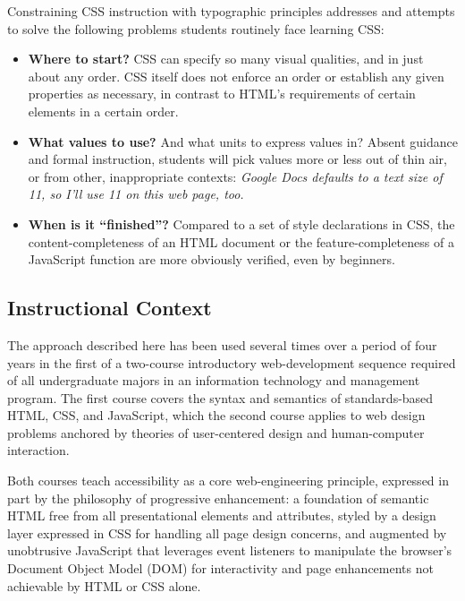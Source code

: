 \documentclass[sigplan,screen]{acmart}
\begin{document}
Constraining CSS instruction with typographic principles addresses and attempts to solve the following problems students routinely face learning CSS:


\begin{itemize}
  \item \textbf{Where to start?} CSS can specify so many visual qualities, and in just about any order. CSS itself does not enforce an order or establish any given properties as necessary, in contrast to HTML’s requirements of certain elements in a certain order.
  \item \textbf{What values to use?} And what units to express values in? Absent guidance and formal instruction, students will pick values more or less out of thin air, or from other, inappropriate contexts: {\itshape Google Docs defaults to a text size of 11, so I’ll use 11 on this web page, too.}
  \item \textbf{When is it “finished”?} Compared to a set of style declarations in CSS, the content-completeness of an HTML document or the feature-completeness of a \linebreak JavaScript function are more obviously verified, even by beginners.
\end{itemize}




\subsection{Instructional Context}
The approach described here has been used several times over a period of four years in the first of a two-course introductory web-development sequence required of all undergraduate majors in an information technology and management program. The first course covers the syntax and semantics of standards-based HTML, CSS, and JavaScript, which the second course applies to web design problems anchored by theories of user-centered design and human-computer interaction.

Both courses teach accessibility as a core web-engineering principle, expressed in part by the philosophy of progressive enhancement: a foundation of semantic HTML free from all presentational elements and attributes, styled by a design layer expressed in CSS for handling all page design concerns, and augmented by unobtrusive JavaScript that leverages event listeners to manipulate the browser’s Document Object Model (DOM) for interactivity and page enhancements not achievable by HTML or CSS alone.
\end{document}
